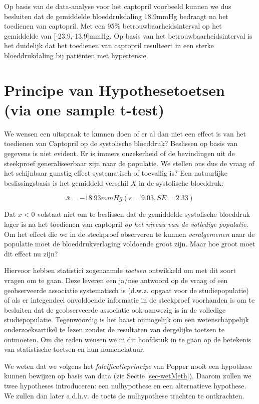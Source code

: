\documentclass[
  dutch,
  letterpaper,
  12pt]{book}
\theoremstyle{definition}
\theoremstyle{definition}
\theoremstyle{definition}
\theoremstyle{remark}
\begin{document}
Op basis van de data-analyse voor het captopril voorbeeld kunnen we dus
besluiten dat de gemiddelde bloeddrukdaling 18.9mmHg bedraagt na het
toedienen van captopril. Met een 95\% betrouwbaarheidsinterval op het
gemiddelde van {[}-23.9,-13.9{]}mmHg. Op basis van het
betrouwbaarheidsinterval is het duidelijk dat het toedienen van
captopril resulteert in een sterke bloeddrukdaling bij patiënten met
hypertensie.

\section{Principe van Hypothesetoetsen (via one sample
t-test)}\label{principe-van-hypothesetoetsen-via-one-sample-t-test}

We wensen een uitspraak te kunnen doen of er al dan niet een effect is
van het toedienen van Captopril op de systolische bloeddruk? Beslissen
op basis van gegevens is niet evident. Er is immers onzekerheid of de
bevindingen uit de steekproef generaliseerbaar zijn naar de populatie.
We stellen ons dus de vraag of het schijnbaar gunstig effect
systematisch of toevallig is? Een natuurlijke beslissingsbasis is het
gemiddeld verschil \(X\) in de systolische bloeddruk:

\[\bar x=-18.93mmHg (s = 9.03, SE = 2.33)\]

Dat \(\bar{x}< 0\) volstaat niet om te beslissen dat de gemiddelde
systolische bloeddruk lager is na het toedienen van captopril \emph{op
het niveau van de volledige populatie}. Om het effect die we in de
steekproef observeren te kunnen \emph{veralgemenen} naar de populatie
moet de bloeddrukverlaging voldoende groot zijn. Maar hoe groot moet dit
effect nu zijn?

Hiervoor hebben statistici zogenaamde \emph{toetsen} ontwikkeld om met
dit soort vragen om te gaan. Deze leveren een ja/nee antwoord op de
vraag of een geobserveerde associatie systematisch is (d.w.z. opgaat
voor de studiepopulatie) of als er integendeel onvoldoende informatie in
de steekproef voorhanden is om te besluiten dat de geobserveerde
associatie ook aanwezig is in de volledige studiepopulatie. Tegenwoordig
is het haast onmogelijk om een wetenschappelijk onderzoeksartikel te
lezen zonder de resultaten van dergelijke toetsen te ontmoeten. Om die
reden wensen we in dit hoofdstuk in te gaan op de betekenis van
statistische toetsen en hun nomenclatuur.

We weten dat we volgens het \emph{falcificatieprincipe} van Popper nooit
een hypothese kunnen bewijzen op basis van data (zie Sectie
\ref{sec-wetMeth}). Daarom zullen we twee hypotheses introduceren: een
nulhypothese en een alternatieve hypothese. We zullen dan later a.d.h.v.
de toets de nulhypothese trachten te ontkrachten.
\end{document}
